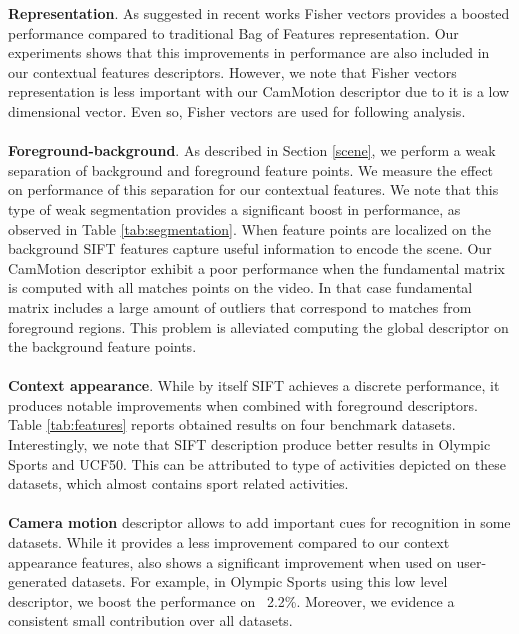 \textbf{Representation}. As suggested in recent works \cite{perronnin2010, wang2013, xwang2013} Fisher vectors provides a boosted performance compared to traditional Bag of Features representation. Our experiments shows that this improvements in performance are also included in our contextual features descriptors. However, we note that Fisher vectors representation is less important with our CamMotion descriptor due to it is a low dimensional vector. Even so, Fisher vectors are used for following analysis.\\\\
\textbf{Foreground-background}. As described in Section \ref{scene}, we perform a weak separation of background and foreground feature points. We measure the effect on performance of this separation for our contextual features. We note that this type of weak segmentation provides a significant boost in performance, as observed in Table \ref{tab:segmentation}. When feature points are localized on the background SIFT features capture useful information to encode the scene. Our CamMotion descriptor exhibit a poor performance when the fundamental matrix is computed with all matches points on the video. In that case fundamental matrix includes a large amount of outliers that correspond to matches from foreground regions. This problem is alleviated computing the global descriptor on the background feature points. \\\\
\textbf{Context appearance}. While by itself SIFT achieves a discrete performance, it produces notable improvements when combined with foreground descriptors. Table \ref{tab:features} reports obtained results on four benchmark datasets. Interestingly, we note that SIFT description produce better results in Olympic Sports and UCF50. This can be attributed to type of activities depicted on these datasets, which almost contains sport related activities.\\\\
\textbf{Camera motion} descriptor allows to add important cues for recognition in some datasets. While it provides a less improvement compared to our context appearance features, also shows a significant improvement when used on user-generated datasets. For example, in Olympic Sports using this low level descriptor, we boost the performance on ~2.2\%. Moreover, we evidence a consistent small contribution over all datasets.

